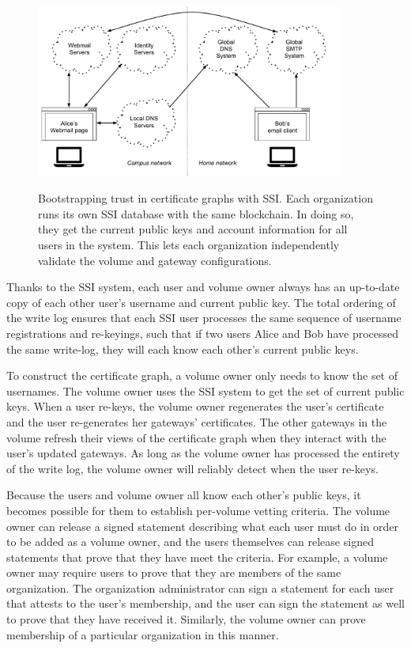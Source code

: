 \begin{figure}[h]
   \caption{Bootstrapping trust in certificate graphs with SSI.  Each
   organization runs its own SSI database with the same blockchain.  In doing
   so, they get the current public keys and account information for all users in
   the system.  This lets each organization independently validate the volume
   and gateway configurations.}
   \centering
   \includegraphics[width=0.9\textwidth,page=15]{figures/dissertation-figures}
   \label{fig:chap2-ssi-system-with-volumes}
\end{figure}

Thanks to the SSI system, each user and volume owner always has an up-to-date
copy of each other user's username and current public key.  The total ordering
of the write log ensures that each SSI user processes the same sequence of
username registrations and re-keyings, such that if two users Alice and Bob have
processed the same write-log, they will each know each other's current public
keys.

To construct the certificate graph, a volume owner only needs to know the set of
usernames.  The volume owner uses the SSI system to get the set of current
public keys.  When a user re-keys, the volume owner regenerates the user's
certificate and the user re-generates her gateways' certificates.  The other
gateways in the volume refresh their views of the certificate graph when they
interact with the user's updated gateways.  As long as the volume owner has
processed the entirety of the write log, the volume owner will reliably detect
when the user re-keys.

Because the users and volume owner all know each other's public keys, it becomes
possible for them to establish per-volume vetting criteria.  The volume owner
can release a signed statement describing what each user must do in order to be
added as a volume owner, and the users themselves can release signed statements
that prove that they have meet the criteria.  For example, a volume owner may
require users to prove that they are members of the same organization.  The
organization administrator can sign a statement for each user that attests to the user's
membership, and the user can sign the statement as well to prove that they have
received it.  Similarly, the volume owner can prove membership of a particular
organization in this manner.

